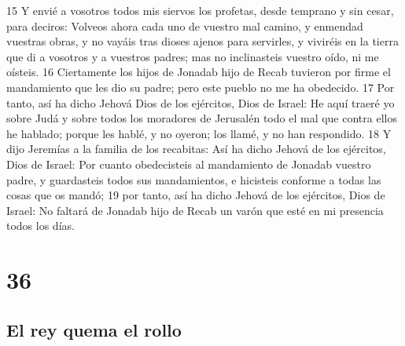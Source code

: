 15 Y envié a vosotros todos mis siervos los profetas, desde temprano y sin cesar, para deciros: Volveos ahora cada uno de vuestro mal camino, y enmendad vuestras obras, y no vayáis tras dioses ajenos para servirles, y viviréis en la tierra que di a vosotros y a vuestros padres; mas no inclinasteis vuestro oído, ni me oísteis.
16 Ciertamente los hijos de Jonadab hijo de Recab tuvieron por firme el mandamiento que les dio su padre; pero este pueblo no me ha obedecido.
17 Por tanto, así ha dicho Jehová Dios de los ejércitos, Dios de Israel: He aquí traeré yo sobre Judá y sobre todos los moradores de Jerusalén todo el mal que contra ellos he hablado; porque les hablé, y no oyeron; los llamé, y no han respondido.
18 Y dijo Jeremías a la familia de los recabitas: Así ha dicho Jehová de los ejércitos, Dios de Israel: Por cuanto obedecisteis al mandamiento de Jonadab vuestro padre, y guardasteis todos sus mandamientos, e hicisteis conforme a todas las cosas que os mandó;
19 por tanto, así ha dicho Jehová de los ejércitos, Dios de Israel: No faltará de Jonadab hijo de Recab un varón que esté en mi presencia todos los días.

\chapter{36}

\section*{El rey quema el rollo}

